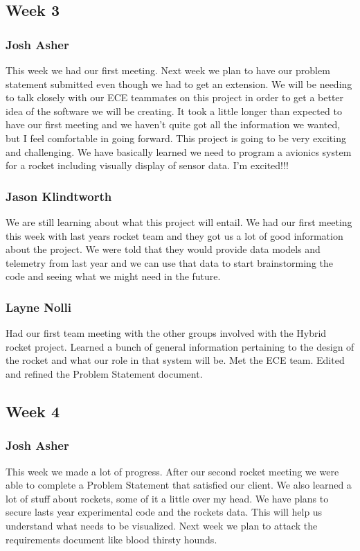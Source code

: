 \documentclass[10pt,draftclsnofoot,onecolumn]{IEEEtran}
\begin{document}
\subsection{Week 3}
\subsubsection{Josh Asher} This week we had our first meeting. Next week we plan to have our problem statement submitted even though we had to get an extension. We will be needing to talk closely with our ECE teammates on this project in order to get a better idea of the software we will be creating. It took a little longer than expected to have our first meeting and we haven't quite got all the information we wanted, but I feel comfortable in going forward. This project is going to be very exciting and challenging. We have basically learned we need to program a avionics system for a rocket including visually display of sensor data. I'm excited!!! \\

\subsubsection{Jason Klindtworth} We are still learning about what this project will entail. We had our first meeting this week with last years rocket team and they got us a lot of good information about the project. We were told that they would provide data models and telemetry from last year and we can use that data to start brainstorming the code and seeing what we might need in the future. \\

\subsubsection{Layne Nolli} Had our first team meeting with the other groups involved with the Hybrid rocket project. Learned a bunch of general information pertaining to the design of the rocket and what our role in that system will be. Met the ECE team. Edited and refined the Problem Statement document.\par

\subsection{Week 4}

\subsubsection{Josh Asher} This week we made a lot of progress. After our second rocket meeting we were able to complete a Problem Statement that satisfied our client. We also learned a lot of stuff about rockets, some of it a little over my head. We have plans to secure lasts year experimental code and the rockets data. This will help us understand what needs to be visualized. Next week we plan to attack the requirements document like blood thirsty hounds.\par
\end{document}
